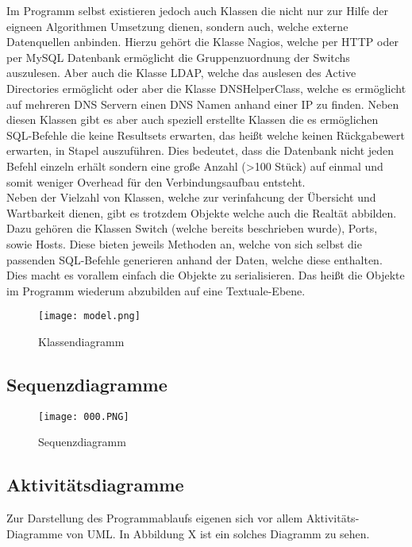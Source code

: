 Im Programm selbst existieren jedoch auch Klassen die nicht nur zur Hilfe der eigneen Algorithmen Umsetzung dienen, sondern auch, welche externe Datenquellen anbinden.
Hierzu gehört die Klasse Nagios, welche per HTTP oder per MySQL Datenbank ermöglicht die Gruppenzuordnung der Switchs auszulesen. Aber auch die Klasse LDAP, welche das auslesen des Active Directories ermöglicht oder aber die Klasse DNSHelperClass, welche es ermöglicht auf mehreren DNS Servern einen DNS Namen anhand einer IP zu finden. Neben diesen Klassen gibt es aber auch speziell erstellte Klassen die es ermöglichen SQL-Befehle die keine Resultsets erwarten, das heißt welche keinen Rückgabewert erwarten, in Stapel auszuführen.
Dies bedeutet, dass die Datenbank nicht jeden Befehl einzeln erhält sondern eine große Anzahl (>100 Stück) auf einmal und somit weniger Overhead für den Verbindungsaufbau entsteht.\\
Neben der Vielzahl von Klassen, welche zur verinfahcung der Übersicht und Wartbarkeit dienen, gibt es trotzdem Objekte welche auch die Realtät abbilden. Dazu gehören die Klassen Switch (welche bereits beschrieben wurde), Ports, sowie Hosts. Diese bieten jeweils Methoden an, welche von sich selbst die passenden SQL-Befehle generieren anhand der Daten, welche diese enthalten. Dies macht es vorallem einfach die Objekte zu serialisieren. Das heißt die Objekte im Programm wiederum abzubilden auf eine Textuale-Ebene.\\

\begin{figure}[H]
\centering
\texttt{[image: model.png]}
\caption{Klassendiagramm}
\label{fig:classdiagram}
\end{figure}

\subsection{Sequenzdiagramme}
\label{subsec:seqdiagrams}

\begin{figure}[H]
\centering
\texttt{[image: 000.PNG]}
\caption{Sequenzdiagramm}
\label{fig:sequecediagram}
\end{figure}

\subsection{Aktivitätsdiagramme}
\label{subsec:acitvitydiagrams}

Zur Darstellung des Programmablaufs eigenen sich vor allem Aktivitäts-Diagramme von UML.
In Abbildung X ist ein solches Diagramm zu sehen.\\

